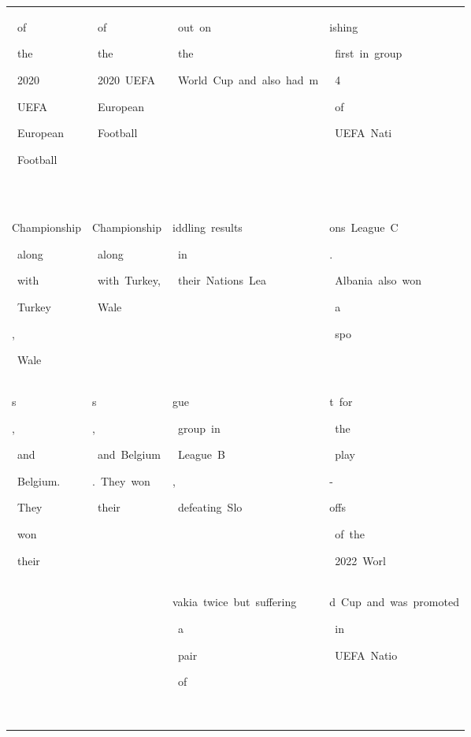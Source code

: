 \begin{table}[h]
\begin{tabular}{ l | l | l | l }
 \colorbox{cm_30!40}{\strut \ of}\colorbox{cm_32!40}{\strut \ the}\colorbox{cm_50!40}{\strut \ 2020}\colorbox{cm_33!40}{\strut \ UEFA}\colorbox{cm_31!40}{\strut \ European}\colorbox{cm_39!40}{\strut \ Football}\colorbox{cm_32!40}{\strut \ } & \colorbox{cm_12!40}{\strut \ of}\colorbox{cm_25!40}{\strut \ the}\colorbox{cm_12!40}{\strut \ 2020\ UEFA}\colorbox{cm_25!40}{\strut \ European}\colorbox{cm_12!40}{\strut \ Football}\colorbox{cm_25!40}{\strut \ } & \colorbox{cm_0!40}{\strut \ out\ on}\colorbox{cm_12!40}{\strut \ the}\colorbox{cm_0!40}{\strut \ World\ Cup\ and\ also\ had\ m} & \colorbox{cm_0!40}{\strut ishing}\colorbox{cm_12!40}{\strut \ first\ in\ group}\colorbox{cm_0!40}{\strut \ 4}\colorbox{cm_12!40}{\strut \ of}\colorbox{cm_0!40}{\strut \ UEFA\ Nati} \\ 
 \colorbox{cm_32!40}{\strut Championship}\colorbox{cm_19!40}{\strut \ along}\colorbox{cm_32!40}{\strut \ with}\colorbox{cm_20!40}{\strut \ Turkey}\colorbox{cm_32!40}{\strut ,}\colorbox{cm_28!40}{\strut \ Wale} & \colorbox{cm_25!40}{\strut Championship}\colorbox{cm_0!40}{\strut \ along}\colorbox{cm_12!40}{\strut \ with\ Turkey,}\colorbox{cm_0!40}{\strut \ Wale} & \colorbox{cm_0!40}{\strut iddling\ results}\colorbox{cm_12!40}{\strut \ in}\colorbox{cm_0!40}{\strut \ their\ Nations\ Lea} & \colorbox{cm_0!40}{\strut ons\ League\ C}\colorbox{cm_12!40}{\strut .}\colorbox{cm_0!40}{\strut \ Albania\ also\ won}\colorbox{cm_12!40}{\strut \ a}\colorbox{cm_0!40}{\strut \ spo} \\ 
 \colorbox{cm_28!40}{\strut s}\colorbox{cm_47!40}{\strut ,}\colorbox{cm_25!40}{\strut \ and}\colorbox{cm_29!40}{\strut \ Belgium.}\colorbox{cm_22!40}{\strut \ They}\colorbox{cm_30!40}{\strut \ won}\colorbox{cm_37!40}{\strut \ their} & \colorbox{cm_0!40}{\strut s}\colorbox{cm_12!40}{\strut ,}\colorbox{cm_25!40}{\strut \ and\ Belgium}\colorbox{cm_12!40}{\strut .\ They\ won}\colorbox{cm_25!40}{\strut \ their} & \colorbox{cm_0!40}{\strut gue}\colorbox{cm_12!40}{\strut \ group\ in}\colorbox{cm_0!40}{\strut \ League\ B}\colorbox{cm_12!40}{\strut ,}\colorbox{cm_0!40}{\strut \ defeating\ Slo} & \colorbox{cm_0!40}{\strut t\ for}\colorbox{cm_12!40}{\strut \ the}\colorbox{cm_0!40}{\strut \ play}\colorbox{cm_12!40}{\strut -}\colorbox{cm_0!40}{\strut offs}\colorbox{cm_12!40}{\strut \ of\ the}\colorbox{cm_0!40}{\strut \ 2022\ Worl} \\ 
  &  & \colorbox{cm_0!40}{\strut vakia\ twice\ but\ suffering}\colorbox{cm_12!40}{\strut \ a}\colorbox{cm_0!40}{\strut \ pair}\colorbox{cm_12!40}{\strut \ of}\colorbox{cm_0!40}{\strut \ } & \colorbox{cm_0!40}{\strut d\ Cup\ and\ was\ promoted}\colorbox{cm_12!40}{\strut \ in}\colorbox{cm_0!40}{\strut \ UEFA\ Natio} \\ 

\end{tabular}
\end{table}
